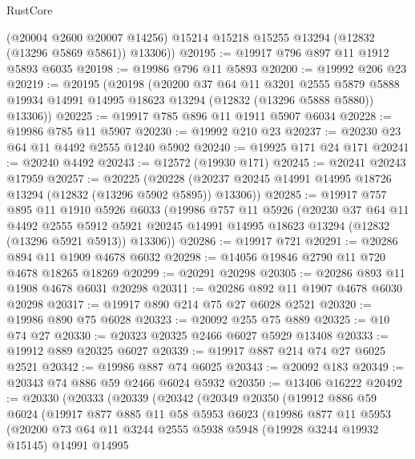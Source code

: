\begin{lexlean}{RustCore}
\begin{coremodule}
        (@20004 @2600 @20007 @14256)
        @15214
        @15218
        @15255
        @13294
        (@12832 (@13296 @5869 @5861))
        @13306))
@20195 := @19917 @796 @897 @11 @1912 @5893 @6035
@20198 := @19986 @796 @11 @5893
@20200 := @19992 @206 @23
@20219 := @20195
    (@20198
      (@20200
        @37
        @64
        @11
        @3201
        @2555
        @5879
        @5888
        @19934
        @14991
        @14995
        @18623
        @13294
        (@12832 (@13296 @5888 @5880))
        @13306))
@20225 := @19917 @785 @896 @11 @1911 @5907 @6034
@20228 := @19986 @785 @11 @5907
@20230 := @19992 @210 @23
@20237 := @20230 @23 @64 @11 @4492 @2555 @1240 @5902
@20240 := @19925 @171 @24 @171
@20241 := @20240 @4492
@20243 := @12572 (@19930 @171)
@20245 := @20241 @20243 @17959
@20257 := @20225
    (@20228 (@20237 @20245 @14991 @14995 @18726 @13294 (@12832 (@13296 @5902 @5895)) @13306))
@20285 := @19917
    @757
    @895
    @11
    @1910
    @5926
    @6033
    (@19986
      @757
      @11
      @5926
      (@20230
        @37
        @64
        @11
        @4492
        @2555
        @5912
        @5921
        @20245
        @14991
        @14995
        @18623
        @13294
        (@12832 (@13296 @5921 @5913))
        @13306))
@20286 := @19917 @721
@20291 := @20286 @894 @11 @1909 @4678 @6032
@20298 := @14056 @19846 @2790 @11 @720 @4678 @18265 @18269
@20299 := @20291 @20298
@20305 := @20286 @893 @11 @1908 @4678 @6031 @20298
@20311 := @20286 @892 @11 @1907 @4678 @6030 @20298
@20317 := @19917 @890 @214 @75 @27 @6028 @2521
@20320 := @19986 @890 @75 @6028
@20323 := @20092 @255 @75 @889
@20325 := @10 @74 @27
@20330 := @20323 @20325 @2466 @6027 @5929 @13408
@20333 := @19912 @889 @20325 @6027
@20339 := @19917 @887 @214 @74 @27 @6025 @2521
@20342 := @19986 @887 @74 @6025
@20343 := @20092 @183
@20349 := @20343 @74 @886 @59 @2466 @6024 @5932
@20350 := @13406 @16222
@20492 := @20330
    (@20333
      (@20339
        (@20342
          (@20349
            @20350
            (@19912
              @886
              @59
              @6024
              (@19917
                @877
                @885
                @11
                @58
                @5953
                @6023
                (@19986
                  @877
                  @11
                  @5953
                  (@20200
                    @73
                    @64
                    @11
                    @3244
                    @2555
                    @5938
                    @5948
                    (@19928 @3244 @19932 @15145)
                    @14991
                    @14995

\end{coremodule}
\end{lexlean}

